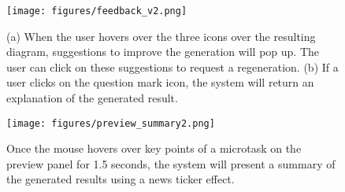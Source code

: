 \begin{figure}[h]
\begin{minipage}{.5\textwidth}
    \captionsetup{width=\linewidth}
    \vspace{0pt}
    \texttt{[image: figures/feedback\_v2.png]}
    \caption{(a) When the user hovers over the three icons over the resulting diagram, suggestions to improve the generation will pop up. The user can click on these suggestions to request a regeneration. (b) If a user clicks on the question mark icon, the system will return an explanation of the generated result.}
    \label{fig:feedback}
\end{minipage}
\begin{minipage}{.45\textwidth}
    \captionsetup{width=.9\linewidth}
    \vspace{0pt}
    \texttt{[image: figures/preview\_summary2.png]}
    \caption{Once the mouse hovers over key points of a microtask on the preview panel for 1.5 seconds, the system will present a summary of the generated results using a news ticker effect.}
    \label{fig:preview_summary}
\end{minipage}
\end{figure}


